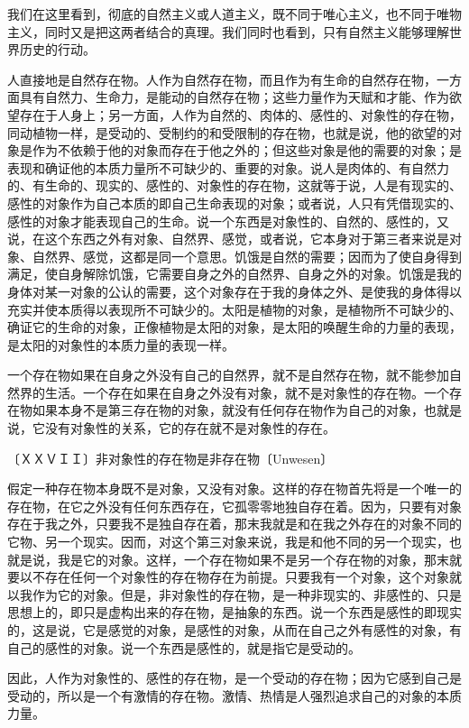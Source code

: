 \documentclass[a4paper,twoside,12pt,AutoFakeBold]{ctexart}
\begin{document}
我们在这里看到，彻底的自然主义或人道主义，既不同于唯心主义，也不同于唯物主义，同时又是把这两者结合的真理。我们同时也看到，只有自然主义能够理解世界历史的行动。
 
人直接地是自然存在物。人作为自然存在物，而且作为有生命的自然存在物，一方面具有自然力、生命力，是能动的自然存在物；这些力量作为天赋和才能、作为欲望存在于人身上；另一方面，人作为自然的、肉体的、感性的、对象性的存在物，同动植物一样，是受动的、受制约的和受限制的存在物，也就是说，他的欲望的对象是作为不依赖于他的对象而存在于他之外的；但这些对象是他的需要的对象；是表现和确证他的本质力量所不可缺少的、重要的对象。说人是肉体的、有自然力的、有生命的、现实的、感性的、对象性的存在物，这就等于说，人是有现实的、感性的对象作为自己本质的即自己生命表现的对象；或者说，人只有凭借现实的、感性的对象才能表现自己的生命。说一个东西是对象性的、自然的、感性的，又说，在这个东西之外有对象、自然界、感觉，或者说，它本身对于第三者来说是对象、自然界、感觉，这都是同一个意思。饥饿是自然的需要；因而为了使自身得到满足，使自身解除饥饿，它需要自身之外的自然界、自身之外的对象。饥饿是我的身体对某一对象的公认的需要，这个对象存在于我的身体之外、是使我的身体得以充实并使本质得以表现所不可缺少的。太阳是植物的对象，是植物所不可缺少的、确证它的生命的对象，正像植物是太阳的对象，是太阳的唤醒生命的力量的表现，是太阳的对象性的本质力量的表现一样。

一个存在物如果在自身之外没有自己的自然界，就不是自然存在物，就不能参加自然界的生活。一个存在如果在自身之外没有对象，就不是对象性的存在物。一个存在物如果本身不是第三存在物的对象，就没有任何存在物作为自己的对象，也就是说，它没有对象性的关系，它的存在就不是对象性的存在。

〔ＸＸＶＩＩ〕非对象性的存在物是非存在物〔Unwesen〕

假定一种存在物本身既不是对象，又没有对象。这样的存在物首先将是一个唯一的存在物，在它之外没有任何东西存在，它孤零零地独自存在着。因为，只要有对象存在于我之外，只要我不是独自存在着，那末我就是和在我之外存在的对象不同的它物、另一个现实。因而，对这个第三对象来说，我是和他不同的另一个现实，也就是说，我是它的对象。这样，一个存在物如果不是另一个存在物的对象，那末就要以不存在任何一个对象性的存在物存在为前提。只要我有一个对象，这个对象就以我作为它的对象。但是，非对象性的存在物，是一种非现实的、非感性的、只是思想上的，即只是虚构出来的存在物，是抽象的东西。说一个东西是感性的即现实的，这是说，它是感觉的对象，是感性的对象，从而在自己之外有感性的对象，有自己的感性的对象。说一个东西是感性的，就是指它是受动的。

因此，人作为对象性的、感性的存在物，是一个受动的存在物；因为它感到自己是受动的，所以是一个有激情的存在物。激情、热情是人强烈追求自己的对象的本质力量。
\end{document}
